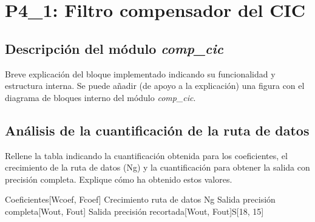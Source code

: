 \documentclass[parskip,a4paper,12pt]{article}
\newcommand{\fila}{}
\begin{document}
\setcounter{tcb@cnt@enunciado}{28}
\renewcommand{\tablename}{Tabla}
\addtocounter{page}{-1}
\startcontents[sections]
\thispagestyle{empty}

\clearpage
\printmyminitoc


\section{P4\_1: Filtro compensador del CIC}
\subsection{Descripción del módulo \emph{comp\_cic}}
\begin{enunciado}{}{}%
Breve explicación del bloque implementado indicando su funcionalidad y estructura interna. Se puede añadir (de apoyo a la explicación) una figura con el diagrama de bloques interno del módulo \emph{comp\_cic}.
\end{enunciado}

\subsection{Análisis de la cuantificación de la ruta de datos}
\begin{enunciado}{}{}%
Rellene la tabla indicando la cuantificación obtenida para los coeficientes, el crecimiento de la ruta de datos (Ng) y la cuantificación para obtener la salida con precisión completa. Explique cómo ha obtenido estos valores.
\end{enunciado}

\def\colUNO{8cm}
\def\colDOS{3cm}
\def\colTRES{3cm}
    
\begin{table}[H]
\begin{center}
   \caption{Cuantificación interna }
    \label{tab:interfaz}
\gdef\cabecera{\fila{}{PARÁMETRO}{VALOR}}
\noindent\begin{mitabla}
\fila {Coeficientes}{[Wcoef, Fcoef]}{}
\fila {Crecimiento ruta de datos }{Ng}{}
\fila{Salida precisión completa}{[Wout, Fout]}{}
\fila{Salida precisión recortada}{[Wout, Fout]}{S[18, 15]}


\end{mitabla}

\end{center}

\end{table}
\end{document}
